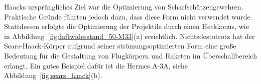 Haacks ursprüngliches Ziel war die Optimierung von Scharfschützengewehren. 
Praktische Gründe führten jedoch dazu, dass diese 
Form nicht verwendet wurde. 
Stattdessen erfolgte die Optimierung der Projektile 
durch einen Heckkonus, wie in Abbildung~\ref{fig:luftwiderstand_50-M33}(a) ersichtlich.
Nichtsdestotrotz hat der Sears-Haack-Körper aufgrund 
seiner strömungsoptimierten Form eine große Bedeutung 
für die Gestaltung von Flugkörpern und Raketen
im Überschallbereich erlangt.
Ein gutes Beispiel dafür ist die Hermes A-3A, siehe Abbildung~\ref{fig:sears_haack}(b).